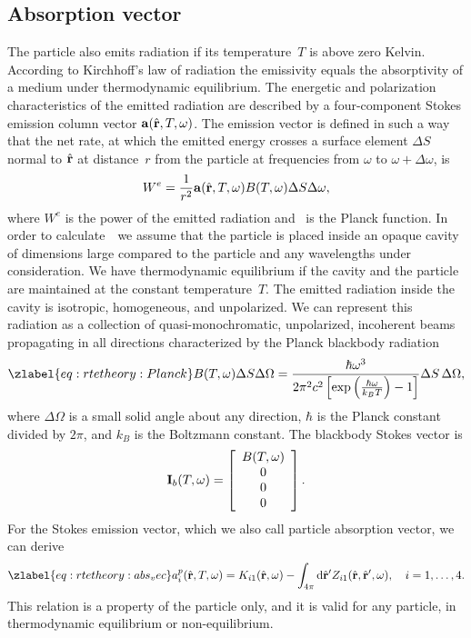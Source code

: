 \subsection{Absorption vector}
The particle also emits radiation if its temperature~$T$ is above zero
Kelvin. According to Kirchhoff's law of radiation the emissivity
equals the absorptivity of a medium under thermodynamic equilibrium.
The energetic and polarization characteristics of the emitted
radiation are described by a four-component Stokes emission column
vector ${\bf a}(\hat{\mathbf{r}}, T, \omega)$. The emission vector is
defined in such a way that the net rate, at which the emitted energy
crosses a surface element $\Delta S$ normal to $\hat{\mathbf{r}}$ at
distance~$r$ from the particle at frequencies from $\omega$ to $\omega
+ \Delta\omega$, is
\begin{equation}
  W^e = \frac{1}{r^2}{\bf a}(\hat{\mathbf{r}}, T, \omega)
  B(T,\omega) \Delta S \Delta\omega,
\end{equation}
where $W^e$ is the power of the emitted radiation and \Planck\ is the
Planck function.  In order to calculate~\AbsVec\ we assume that the
particle is placed inside an opaque cavity of dimensions large
compared to the particle and any wavelengths under consideration. We
have thermodynamic equilibrium if the cavity and the particle are
maintained at the constant temperature~$T$. The emitted radiation
inside the cavity is isotropic, homogeneous, and unpolarized. We can
represent this radiation as a collection of quasi-monochromatic,
unpolarized, incoherent beams propagating in all directions
characterized by the Planck blackbody radiation
\begin{equation}
  \zlabel{eq:rtetheory:Planck}
  \Planck(T,\omega)\Delta S \Delta\Omega =
    \frac{\hbar\omega^3}{2\pi^2 c^2\left[\exp\left(\frac{\hbar\omega}{k_B T}\right) -1\right]}
     \Delta S \, \Delta\Omega,
\end{equation}
where $\Delta \Omega$ is a small solid angle about any direction,
$\hbar$ is the Planck constant divided by $2\pi$, and $k_B$ is the
Boltzmann constant. The blackbody Stokes vector is
\begin{equation}
  {\bf I}_b(T, \omega) = \left[ \begin{array}{c} B(T,\omega)\\ 0 \\ 0 \\ 0 \end{array} \right].
\end{equation}
For the Stokes emission vector, which we also call particle absorption
vector, we can derive
\begin{equation}
  \zlabel{eq:rtetheory:abs_vec}
  a_i^p(\hat{\VctStl{r}}, T, \omega) =
  K_{i1}(\hat{\VctStl{r}},\omega) - \int_{4\pi} \DiffD\hat{\VctStl{r}}' Z_{i1}(\hat{\VctStl{r}}, \hat{\VctStl{r}}', \omega) ,
 \quad i = 1,\ldots,4. 
\end{equation}
This relation is a property of the particle only, and it is valid for
any particle, in thermodynamic equilibrium or non-equilibrium.


